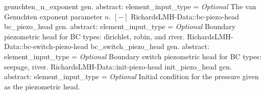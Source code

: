 \begin{RecordType}
			{genuchten{\_}n{\_}exponent}
			{{gen. abstract: }}{{element{\_}input{\_}type}{ = }}
			{ \it{Optional}}
			{{{The van Genuchten exponent parameter }{$ n $}{. }{$[-]$}%
}}
		\RecKey
			{RichardsLMH-Data::bc-piezo-head}
			{bc{\_}piezo{\_}head}
			{{gen. abstract: }}{{element{\_}input{\_}type}{ = }}
			{ \it{Optional}}
			{{{Boundary piezometric head for BC types: dirichlet, robin, and river.}%
}}
		\RecKey
			{RichardsLMH-Data::bc-switch-piezo-head}
			{bc{\_}switch{\_}piezo{\_}head}
			{{gen. abstract: }}{{element{\_}input{\_}type}{ = }}
			{ \it{Optional}}
			{{{Boundary switch piezometric head for BC types: seepage, river.}%
}}
		\RecKey
			{RichardsLMH-Data::init-piezo-head}
			{init{\_}piezo{\_}head}
			{{gen. abstract: }}{{element{\_}input{\_}type}{ = }}
			{ \it{Optional}}
			{{{Initial condition for the pressure given as the piezometric head.}%
}}
\end{RecordType}
